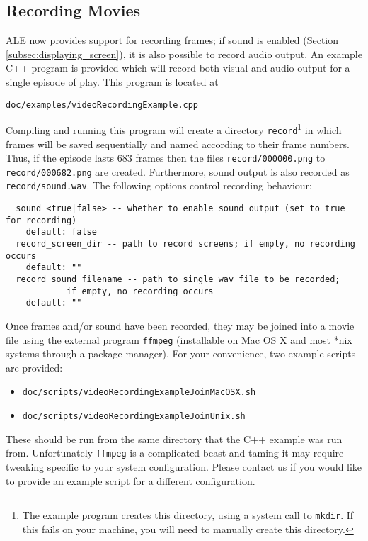 \documentclass[12pt]{article}
\begin{document}
\subsection{Recording Movies}

ALE now provides support for recording frames; if sound is enabled (Section \ref{subsec:displaying_screen}), it is also possible to record audio output.
An example C++ program is provided which will record both visual and audio output for a single episode of play. This program is located at

\begin{center}
\texttt{doc/examples/videoRecordingExample.cpp}
\end{center}

Compiling and running this program will create a directory \texttt{record}\footnote{The example program creates this directory, using a system call to \texttt{mkdir}. If this fails on your machine, you will need to manually create this directory.} in which frames will be saved sequentially and named according to their frame numbers. Thus, if the episode lasts 683 frames then the files \verb+record/000000.png+ to \verb+record/000682.png+ are created. Furthermore, sound output is also recorded as \verb+record/sound.wav+. The following options control recording behaviour:

\small{
\begin{verbatim}
  sound <true|false> -- whether to enable sound output (set to true for recording)
    default: false
  record_screen_dir -- path to record screens; if empty, no recording occurs
    default: ""
  record_sound_filename -- path to single wav file to be recorded; 
            if empty, no recording occurs
    default: ""
\end{verbatim}
}

Once frames and/or sound have been recorded, they may be joined into a movie file using the external program \texttt{ffmpeg} (installable on Mac OS X and most *nix systems through a package manager). For your convenience, two example scripts are provided:

\begin{itemize}
    \item{\texttt{doc/scripts/videoRecordingExampleJoinMacOSX.sh}}
    \item{\texttt{doc/scripts/videoRecordingExampleJoinUnix.sh}}
\end{itemize}

These should be run from the same directory that the C++ example was run from. Unfortunately \texttt{ffmpeg} is a complicated beast and taming it may require tweaking specific to your system configuration. Please contact us if you would like to provide an example script for a different configuration.
\end{document}
